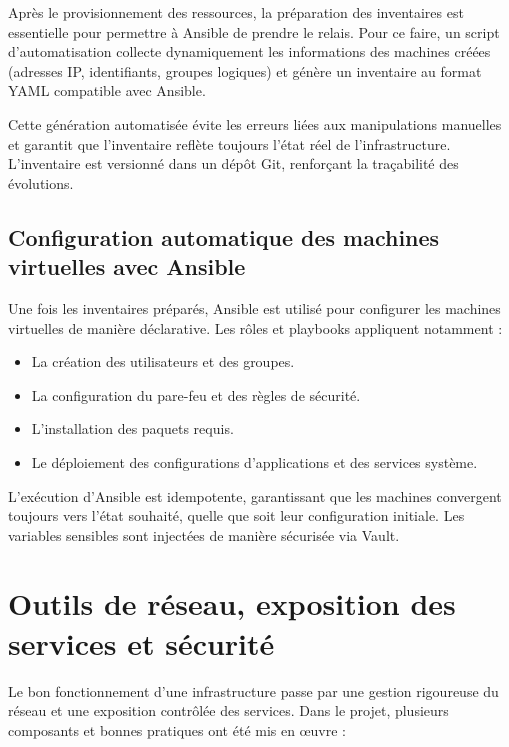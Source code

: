 Après le provisionnement des ressources, la préparation des inventaires est essentielle pour permettre à Ansible de prendre le relais.
Pour ce faire, un script d'automatisation collecte dynamiquement les informations des machines créées (adresses IP, identifiants, groupes logiques) et génère un inventaire au format YAML compatible avec Ansible.

Cette génération automatisée évite les erreurs liées aux manipulations manuelles et garantit que l'inventaire reflète toujours l'état réel de l'infrastructure.
L'inventaire est versionné dans un dépôt Git, renforçant la traçabilité des évolutions.

\subsection{Configuration automatique des machines virtuelles avec Ansible}

Une fois les inventaires préparés, Ansible est utilisé pour configurer les machines virtuelles de manière déclarative.
Les rôles et playbooks appliquent notamment :
\begin{itemize}
	\item La création des utilisateurs et des groupes.
	\item La configuration du pare-feu et des règles de sécurité.
	\item L'installation des paquets requis.
	\item Le déploiement des configurations d’applications et des services système.
\end{itemize}

L'exécution d'Ansible est idempotente, garantissant que les machines convergent toujours vers l'état souhaité, quelle que soit leur configuration initiale.
Les variables sensibles sont injectées de manière sécurisée via Vault.

\section{Outils de réseau, exposition des services et sécurité}

Le bon fonctionnement d'une infrastructure passe par une gestion rigoureuse du réseau et une exposition contrôlée des services.
Dans le projet, plusieurs composants et bonnes pratiques ont été mis en œuvre :

